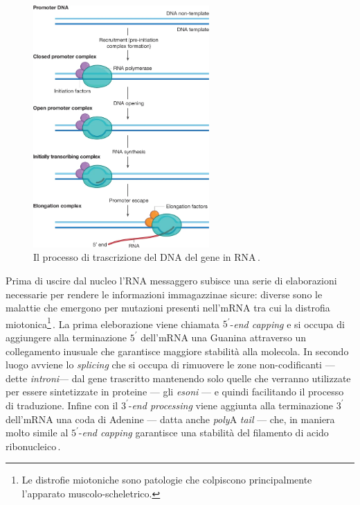 \begin{figure}[b!]
    \centering
    \includegraphics[width=0.6\textwidth]{assets/gene-transcription.png}
    \caption[Il processo di trascrizione del DNA del gene in RNA.]{Il processo di trascrizione del DNA del gene in RNA\,\cite{cramer2019organization}.}\label{fig:gene-transription}
\end{figure}

Prima di uscire dal nucleo l'RNA messaggero subisce una serie di elaborazioni necessarie per rendere le informazioni immagazzinae sicure: diverse sono le malattie che emergono per mutazioni presenti nell'mRNA tra cui la distrofia miotonica\footnote{Le distrofie miotoniche sono patologie che colpiscono principalmente l'apparato muscolo-scheletrico.}\,\cite{philips2000rna}. La prima eleborazione viene chiamata $5^\prime$-\textit{end capping} e si occupa di aggiungere alla terminazione $5^\prime$ dell'mRNA una Guanina attraverso un collegamento inusuale che garantisce maggiore stabilità alla molecola. In secondo luogo avviene lo \textit{splicing} che si occupa di rimuovere le zone non-codificanti — dette \textsl{introni}— dal gene trascritto mantenendo solo quelle che verranno utilizzate per essere sintetizzate in proteine — gli \textsl{esoni} — e quindi facilitando il processo di traduzione. Infine con il $3^\prime$-\textit{end processing} viene aggiunta alla terminazione $3^\prime$ dell'mRNA una coda di Adenine — datta anche \textit{poly}A \textit{tail} — che, in maniera molto simile al $5^\prime$-\textit{end capping} garantisce una stabilità del filamento di acido ribonucleico\,\cite{hocine2010rna}.


